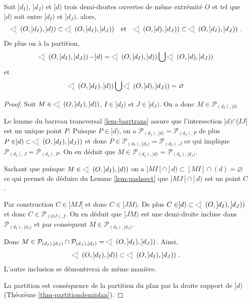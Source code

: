 \begin{thm}\label{thm-incluspart}
    Soit $]d_I)$, $]d_J)$ et $]d)$ trois demi-droites ouvertes de même extrémité $O$ et tel que $]d)$ soit entre $]d_I)$ et $]d_J)$. alors,
    \begin{equation*}
    \begin{array}{ccc}
         \anglesaillant\left({O},{]d_I)},{]d)}\right)\subset \anglesaillant\left({O},{]d_I)},{]d_J)}\right) & \text{et} & \anglesaillant\left({O},{]d)},{]d_J)}\right)\subset\anglesaillant\left({O},{]d_I)},{]d_J)}\right)\,.
    \end{array}
    \end{equation*}
    De plus on à la partition,
    \begin{equation*}
        \anglesaillant\left({O},{]d_I)},{]d_J)}\right) - ]d) = \anglesaillant\left({O},{]d_I)},{]d)}\right) \bigcup \anglesaillant\left({O},{]d)},{]d_J)}\right) 
    \end{equation*}
    et
    \begin{equation*}
        \anglesaillant\left({O},{]d_I)},{]d)}\right) \bigcup \anglesaillant\left({O},{]d)},{]d_J)}\right) = \varnothing
    \end{equation*}
\begin{proof}
    Soit $M\in \anglesaillant\left({O},{]d_I)},{]d)}\right)$, $I\in]d_I)$ et $J\in]d_J)$. On a donc $M\in\mathcal{P}_{(d_I),]d)}$
    
    Le lemme du barreau transversal \ref{lem-barrtrans} assure que l'intersection $]d)\cap ]IJ[$ est un unique point $P$. Puisque $P\in]d)$, on a $\mathcal{P}_{(d_I),]d)}=\mathcal{P}_{(d_I),P}$ de plus $P\in ]d)\subset \anglesaillant\left({O},{]d_I)},{]d_J)}\right)$ et donc $P\in \mathcal{P}_{(d_I),]d_J)}=\mathcal{P}_{(d_I),J}$ ce qui implique $\mathcal{P}_{(d_I),J}=\mathcal{P}_{(d_I),P}$. On en déduit que $M\in \mathcal{P}_{(d_I),]d)} = \mathcal{P}_{(d_I),]d_J)}$.

    Sachant que puisque $M\in \anglesaillant\left({O},{]d_I)},{]d)}\right)$ on a $]MI[\cap ]d)\subset [MI]\cap (d)=\varnothing$ ce qui permet de déduire du Lemme \ref{lem-pashsect} que $]MJ[\cap ]d)$ est un point $C$. 

    Par construction $C\in]MJ[$ et donc $C\in]JM)$. De plus $C\in ]d)\subset \anglesaillant\left({O},{]d_I)},{]d_J)}\right)$ et donc $C\in \mathcal{P}_{(OJ),I}$. On en déduit que $]JM)$ est une demi-droite incluse dans $\mathcal{P}_{(d_I),]d_J)}$ et par conséquent $M\in\mathcal{P}_{(d_I),]d_J)}$.

    Donc $M\in \mathcal{P}_{(d_I),]d_J)}\cap \mathcal{P}_{(d_J),]d_I)}= \anglesaillant\left({O},{]d_I)},{]d_J)}\right)$. Ainsi,
    \begin{equation*}
        \anglesaillant\left({O},{]d_I)},{]d)}\right)\subset \anglesaillant\left({O},{]d_I)},{]d_J)}\right) \,.
    \end{equation*}
    L'autre inclusion se démontrerai de même manière.

    La partition est conséquence de la partition du plan par la droite support de $]d)$ (Théorème \ref{thm-partitiondemiplan}). 
\end{proof}
\end{thm}

